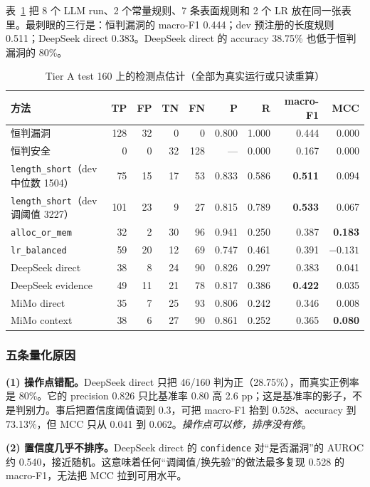 \documentclass[conference]{IEEEtran}
\newcommand{\best}[1]{\textbf{#1}}
\begin{document}
表~\ref{tab:detect} 把 8 个 LLM run、2 个常量规则、7 条表面规则和 2 个 LR 放在同一张表里。最刺眼的三行是：恒判漏洞的 macro-F1 0.444；dev 预注册的长度规则 0.511；DeepSeek direct 0.383。DeepSeek direct 的 accuracy 38.75\% 也低于恒判漏洞的 80\%。

\begin{table}[t]
\centering
\caption{Tier A test 160 上的检测点估计（全部为真实运行或只读重算）}
\label{tab:detect}
\footnotesize
\setlength{\tabcolsep}{4pt}
\begin{tabular}{@{}lrrrrrrrr@{}}
\toprule
方法 & TP & FP & TN & FN & P & R & macro-F1 & MCC \\
\midrule
恒判漏洞 & 128 & 32 & 0 & 0 & 0.800 & 1.000 & 0.444 & 0.000 \\
恒判安全 & 0 & 0 & 32 & 128 & --- & 0.000 & 0.167 & 0.000 \\
\texttt{length\_short}（dev 中位数 1504） & 75 & 15 & 17 & 53 & 0.833 & 0.586 & \best{0.511} & 0.094 \\
\texttt{length\_short}（dev 调阈值 3227） & 101 & 23 & 9 & 27 & 0.815 & 0.789 & \best{0.533} & 0.067 \\
\texttt{alloc\_or\_mem} & 32 & 2 & 30 & 96 & 0.941 & 0.250 & 0.387 & \best{0.183} \\
\texttt{lr\_balanced} & 59 & 20 & 12 & 69 & 0.747 & 0.461 & 0.391 & $-0.131$ \\
DeepSeek direct & 38 & 8 & 24 & 90 & 0.826 & 0.297 & 0.383 & 0.041 \\
DeepSeek evidence & 49 & 11 & 21 & 78 & 0.817 & 0.386 & \best{0.422} & 0.035 \\
MiMo direct & 35 & 7 & 25 & 93 & 0.806 & 0.242 & 0.346 & 0.008 \\
MiMo context & 38 & 6 & 27 & 90 & 0.861 & 0.252 & 0.365 & \best{0.080} \\
\bottomrule
\end{tabular}
\end{table}

\subsubsection{五条量化原因}

\textbf{(1) 操作点错配。}DeepSeek direct 只把 46/160 判为正（28.75\%），而真实正例率是 80\%。它的 precision 0.826 只比基准率 0.80 高 2.6 pp；这是基准率的影子，不是判别力。事后把置信度阈值调到 0.3，可把 macro-F1 抬到 0.528、accuracy 到 73.13\%，但 MCC 只从 0.041 到 0.062。\emph{操作点可以修，排序没有修}。

\textbf{(2) 置信度几乎不排序。}DeepSeek direct 的 \texttt{confidence} 对“是否漏洞”的 AUROC 约 0.540，接近随机。这意味着任何“调阈值/换先验”的做法最多复现 0.528 的 macro-F1，无法把 MCC 拉到可用水平。
\end{document}
